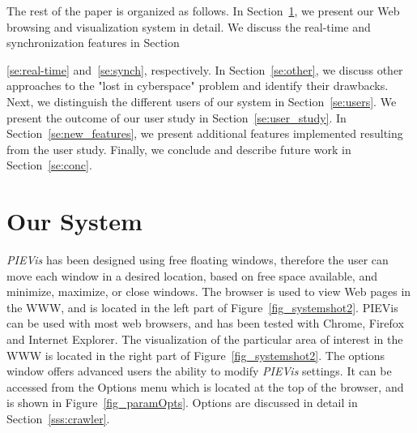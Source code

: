 \documentclass[]{article}
\begin{document}
The rest of the paper is organized as follows.
In Section~\ref{se:system}, we present our Web browsing and visualization system in detail.
We discuss the real-time and synchronization features in Section~{\ref{se:real-time} and~\ref{se:synch}, respectively.
In Section~\ref{se:other}, we discuss other approaches to the "lost in cyberspace" problem and identify their drawbacks.
Next, we distinguish the different users of our system in Section~\ref{se:users}.
We present the outcome of our user study in Section~\ref{se:user_study}.
In Section~\ref{se:new_features}, we present additional features implemented resulting from the user study.
Finally, we conclude and describe future work in Section~\ref{se:conc}.

\section{Our System}
\label{se:system}

{\em PIEVis} has been designed using free floating windows, therefore the user can move each window in a desired location, based on free space available, and minimize, maximize, or close windows. The browser is used to view Web pages in the WWW, and is located in the left part of Figure~\ref{fig_systemshot2}. PIEVis can be used with most web browsers, and has been tested with Chrome, Firefox and Internet Explorer. The visualization of the particular area of interest in the WWW is located in the right part of Figure~\ref{fig_systemshot2}. The options window offers advanced users the ability to modify {\em PIEVis} settings. It can be accessed from the Options menu which is located at the top of the browser, and is shown in Figure~\ref{fig_paramOpts}. Options are discussed in detail in Section~\ref{sss:crawler}.

}
\end{document}
